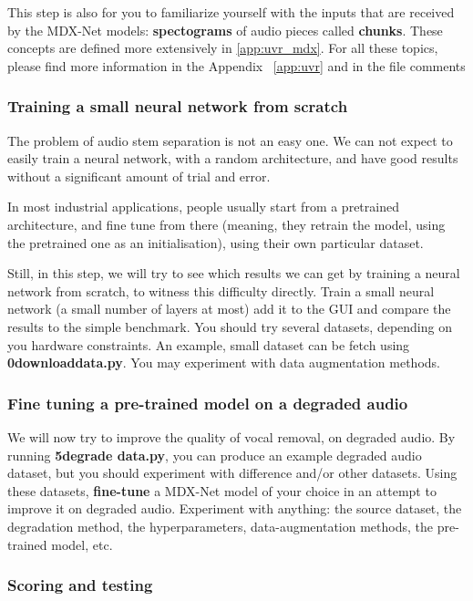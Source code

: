 \documentclass[
10pt, %
a4paper, %
oneside, %
headinclude,footinclude, %
BCOR5mm, %
]{scrartcl}
\begin{document}
This step is also for you to familiarize yourself with the inputs that are received by the MDX-Net models: \textbf{spectograms} of audio pieces called \textbf{chunks}. These concepts are defined more extensively in \ref{app:uvr_mdx}. For all these topics, please find more information in the Appendix ~\ref{app:uvr} and in the file comments

\subsubsection{Training a small neural network from scratch}%
\label{ssub:smallnn}

The problem of audio stem separation is not an easy one. We can not expect to easily train a neural network, with a random architecture, and have good results without a significant amount of trial and error.

In most industrial applications, people usually start from a pretrained architecture, and fine tune from there (meaning, they retrain the model, using the pretrained one as an initialisation), using their own particular dataset.

Still, in this step, we will try to see which results we can get by training a neural network from scratch, to witness this difficulty directly. Train a small neural network (a small number of layers at most) add it to the GUI and compare the results to the simple benchmark. You should try several datasets, depending on you hardware constraints. An example, small dataset can be fetch using \textbf{0\textunderscore download\textunderscore data.py}. You may experiment with data augmentation methods.

\subsubsection{Fine tuning a pre-trained model on a degraded audio}%
\label{ssub:fine_tune}

We will now try to improve the quality of vocal removal, on degraded audio. By running \textbf{5\textunderscore degrade \textunderscore data.py}, you can produce an example degraded audio dataset, but you should experiment with difference and/or other datasets. Using these datasets, \textbf{fine-tune} a MDX-Net model of your choice in an attempt to improve it on degraded audio. Experiment with anything: the source dataset, the degradation method, the hyperparameters, data-augmentation methods, the pre-trained model, etc. 

\subsubsection{Scoring and testing}%
\label{ssub:fine_tune}
\end{document}
